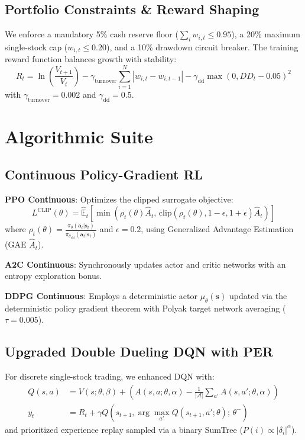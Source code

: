 \documentclass[10pt,journal,compsoc]{IEEEtran}
\begin{document}
\subsection{Portfolio Constraints \& Reward Shaping}
We enforce a mandatory 5\% cash reserve floor ($\sum_i w_{i,t} \le 0.95$), a 20\% maximum single-stock cap ($w_{i,t} \le 0.20$), and a 10\% drawdown circuit breaker. The training reward function balances growth with stability:
\begin{equation}
R_t = \ln\left(\frac{V_{t+1}}{V_t}\right) - \gamma_{\text{turnover}} \sum_{i=1}^N |w_{i, t} - w_{i, t-1}| - \gamma_{\text{dd}} \max\left(0, DD_t - 0.05\right)^2
\end{equation}
with $\gamma_{\text{turnover}} = 0.002$ and $\gamma_{\text{dd}} = 0.5$.

\section{Algorithmic Suite}

\subsection{Continuous Policy-Gradient RL}
\textbf{PPO Continuous}: Optimizes the clipped surrogate objective:
\begin{equation}
L^{\text{CLIP}}(\theta) = \hat{\mathbb{E}}_t \left[ \min\left( \rho_t(\theta) \hat{A}_t, \, \text{clip}(\rho_t(\theta), 1 - \epsilon, 1 + \epsilon) \hat{A}_t \right) \right]
\end{equation}
where $\rho_t(\theta) = \frac{\pi_\theta(\mathbf{a}_t|\mathbf{s}_t)}{\pi_{\theta_{\text{old}}}(\mathbf{a}_t|\mathbf{s}_t)}$ and $\epsilon = 0.2$, using Generalized Advantage Estimation (GAE $\hat{A}_t$).

\textbf{A2C Continuous}: Synchronously updates actor and critic networks with an entropy exploration bonus.

\textbf{DDPG Continuous}: Employs a deterministic actor $\mu_\theta(\mathbf{s})$ updated via the deterministic policy gradient theorem with Polyak target network averaging ($\tau = 0.005$).

\subsection{Upgraded Double Dueling DQN with PER}
For discrete single-stock trading, we enhanced DQN with:
\begin{align}
Q(s, a) &= V(s; \theta, \beta) + \left(A(s, a; \theta, \alpha) - \frac{1}{|\mathcal{A}|}\sum_{a'} A(s, a'; \theta, \alpha)\right) \\
y_t &= R_t + \gamma Q\left(s_{t+1}, \arg\max_{a'} Q(s_{t+1}, a'; \theta); \, \theta^-\right)
\end{align}
and prioritized experience replay sampled via a binary SumTree ($P(i) \propto |\delta_i|^\alpha$).
\end{document}
